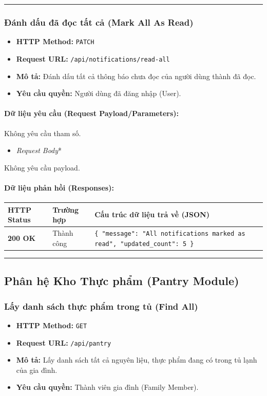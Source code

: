 \documentclass[12pt,a4paper]{article}
\begin{document}
\vskip 0.4cm
\noindent\rule{\textwidth}{0.3pt}
\vskip 0.4cm

\subsubsection{Đánh dấu đã đọc tất cả (Mark All As Read)}
\begin{itemize}[leftmargin=*]
    \item \textbf{HTTP Method:} \texttt{PATCH}
    \item \textbf{Request URL:} \texttt{/api/notifications/read-all}
    \item \textbf{Mô tả:} Đánh dấu tất cả thông báo chưa đọc của người dùng thành đã đọc.
    \item \textbf{Yêu cầu quyền:} Người dùng đã đăng nhập (User).
\end{itemize}

\paragraph{Dữ liệu yêu cầu (Request Payload/Parameters):}
Không yêu cầu tham số.
\begin{itemize}[leftmargin=*]
    \item \textit{Request Body}*
\end{itemize}

Không yêu cầu payload.

\paragraph{Dữ liệu phản hồi (Responses):}
\begin{longtable}{|p{2.8cm}|p{3.2cm}|p{8.0cm}|}
\hline
\textbf{HTTP Status} & \textbf{Trường hợp} & \textbf{Cấu trúc dữ liệu trả về (JSON)} \\ \hline
\endhead
\textbf{200 OK} & Thành công & \texttt{\{ "message": "All notifications marked as read", "updated\_count": 5 \}} \\ \hline
\end{longtable}

\vskip 0.4cm
\noindent\rule{\textwidth}{0.3pt}
\vskip 0.4cm

\subsection{Phân hệ Kho Thực phẩm (Pantry Module)}

\subsubsection{Lấy danh sách thực phẩm trong tủ (Find All)}
\begin{itemize}[leftmargin=*]
    \item \textbf{HTTP Method:} \texttt{GET}
    \item \textbf{Request URL:} \texttt{/api/pantry}
    \item \textbf{Mô tả:} Lấy danh sách tất cả nguyên liệu, thực phẩm đang có trong tủ lạnh của gia đình.
    \item \textbf{Yêu cầu quyền:} Thành viên gia đình (Family Member).
\end{itemize}
\end{document}
